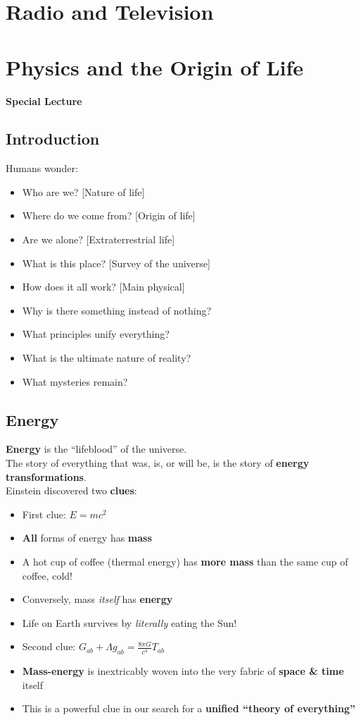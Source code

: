 \documentclass[12pt]{article}
\theoremstyle{definition}
\newcommand{\lecture}[1]{\marginpar{{\footnotesize $\leftarrow$ \underline{#1}}}}
\begin{document}
\section{Radio and Television}




\section{Physics and the Origin of Life}
\lecture{November 7, 2016}
\textbf{Special Lecture} \\

\subsection{Introduction}
Humans wonder:
\begin{itemize}
  \item Who are we? [Nature of life]
  \item Where do we come from? [Origin of life]
  \item Are we alone? [Extraterrestrial life]
  \item What is this place? [Survey of the universe]
  \item How does it all work? [Main physical]
  \item Why is there something instead of nothing?
  \item What principles unify everything?
  \item What is the ultimate nature of reality?
  \item What mysteries remain?
\end{itemize}

\subsection{Energy}
\textbf{Energy} is the ``lifeblood'' of the universe. \\
The story of everything that was, is, or will be, is the story of \textbf{energy transformations}. \\

Einstein discovered two \textbf{clues}:
\begin{itemize}
  \item First clue: $E = mc^{2}$
  \item \textbf{All} forms of energy has \textbf{mass}
  \item A hot cup of coffee (thermal energy) has \textbf{more mass} than the same cup of coffee, cold!
  \bigskip
  \item Conversely, mass \emph{itself} has \textbf{energy}
  \item Life on Earth survives by \emph{literally} eating the Sun!
  \bigskip
  \item Second clue: $G_{ab} + \Lambda g_{ab} = \frac{8\pi G}{c^{4}}T_{ab}$
  \item \textbf{Mass-energy} is inextricably woven into the very fabric of \textbf{space \& time} itself
  \item This is a powerful clue in our search for a \textbf{unified ``theory of everything''}
\end{itemize}
\end{document}
